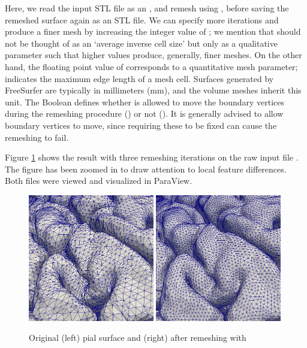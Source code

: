 \noindent Here, we read the input STL file as an \svmtk{}
, and remesh using
, before saving the remeshed
surface again as an STL file. We can specify more iterations and
produce a finer mesh by increasing the integer value of
; we mention that  should not be thought of as 
an `average inverse cell size' but only as a qualitative parameter such that 
higher values produce, generally, finer meshes.  On the other hand, the floating 
point value of  corresponds to a quantitative mesh parameter; %
%
 indicates the maximum edge length of a mesh cell. Surfaces 
generated by FreeSurfer are typically in millimeters (mm), and the volume meshes
inherit this unit. The Boolean
 defines whether \svmtk{}
is allowed to move the boundary vertices during the remeshing
procedure () or not (). It is
generally advised to allow boundary vertices to move, since requiring
these to be fixed can cause the remeshing to fail.

Figure \ref{fig:chp3:ernie-remesh} shows the result
 with three remeshing iterations on the raw
input file . The figure has been zoomed in to draw
attention to local feature differences. Both files were viewed
and visualized in ParaView.
\begin{figure}
  \centering
  \includegraphics[width=0.49\textwidth]{./graphics/chp3/raw-stlmesh.png}
  \includegraphics[width=0.49\textwidth]{./graphics/chp3/remesh-stlmesh.png}
  \caption{Original (left) pial surface and (right) after remeshing with \svmtk{}}
  \label{fig:chp3:ernie-remesh}
\end{figure}


